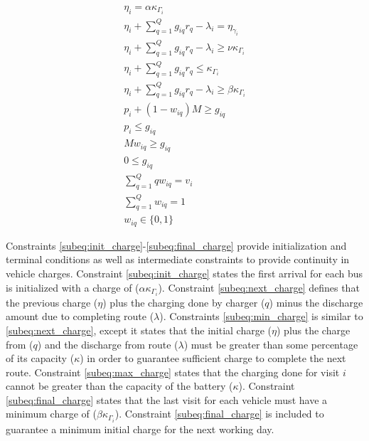 \documentclass[letterpaper, 10pt, conference]{IEEEtran}
\begin{document}
\begin{subequations}
\label{eq:dynconstrs}
\begin{align}
    \eta_i = \alpha \kappa_{\Gamma_i}                                         \label{subeq:init_charge}  \\
    \eta_i + \sum_{q=1}^Q g_{iq} r_q - \lambda_i = \eta_{\gamma_i}            \label{subeq:next_charge}  \\
    \eta_i + \sum_{q=1}^Q g_{iq} r_q - \lambda_i \geq \nu \kappa_{\Gamma_i}   \label{subeq:min_charge}   \\
    \eta_i + \sum_{q=1}^Q g_{iq} r_q \leq \kappa_{\Gamma_i}                   \label{subeq:max_charge}   \\
    \eta_i + \sum_{q=1}^Q g_{iq} r_q - \lambda_i \geq \beta \kappa_{\Gamma_i} \label{subeq:final_charge} \\
    p_i + (1 - w_{iq})M \geq g_{iq}                                           \label{subeq:gpgret}       \\
    p_i \leq g_{iq}                                                           \label{subeq:gples}        \\
    Mw_{iq} \geq g_{iq}                                                       \label{subeq:gwgret}       \\
    0 \leq g_{iq}                                                             \label{subeq:gwles}        \\
    \sum_{q=1}^Q qw_{iq} = v_i                                                \label{subeq:wmax}         \\
    \sum_{q=1}^Q w_{iq} = 1                                                   \label{subeq:wone}         \\
    w_{iq} \in \{0,1\}                                                        \label{subeq:wspace}
\end{align}
\end{subequations}

Constraints \eqref{subeq:init_charge}-\eqref{subeq:final_charge} provide initialization and terminal conditions as well as intermediate constraints to provide continuity in vehicle charges. Constraint \eqref{subeq:init_charge} states the first arrival for each bus is initialized with a charge of (\(\alpha \kappa_{\Gamma_i}\)). Constraint \eqref{subeq:next_charge} defines that the previous charge (\(\eta\)) plus the charging done by charger (\(q\)) minus the discharge amount due to completing route (\(\lambda\)). Constraints \eqref{subeq:min_charge} is similar to \eqref{subeq:next_charge}, except it states that the initial charge (\(\eta\)) plus the charge from (\(q\)) and the discharge from route (\(\lambda\)) must be greater than some percentage of its capacity (\(\kappa\)) in order to guarantee sufficient charge to complete the next route. Constraint \eqref{subeq:max_charge} states that the charging done for visit \(i\) cannot be greater than the capacity of the battery (\(\kappa\)). Constraint \eqref{subeq:final_charge} states that the last visit for each vehicle must have a minimum charge of (\(\beta \kappa_{\Gamma_i}\)). Constraint \eqref{subeq:final_charge} is included to guarantee a minimum initial charge for the next working day.
\end{document}
